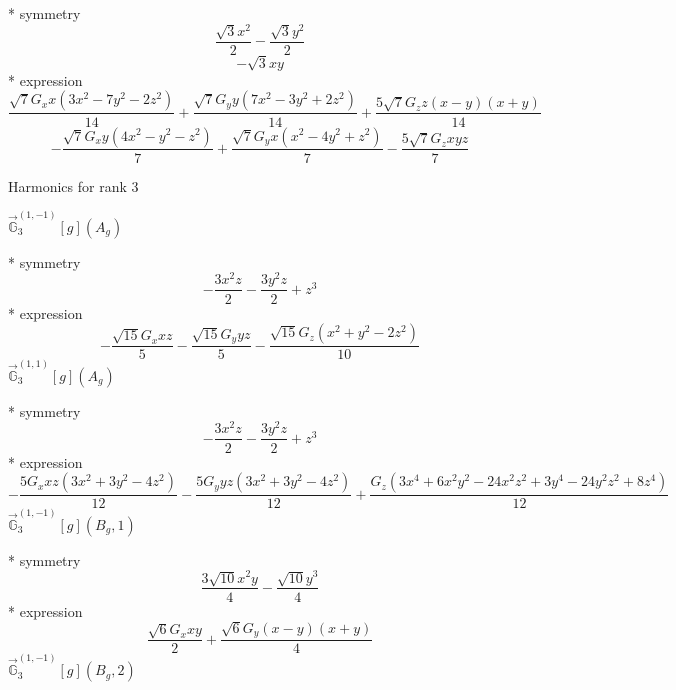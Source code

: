 \documentclass[fleqn,8pt]{jsarticle}
\begin{document}
\noindent\quad ** symmetry
\begin{dmath*}
\frac{\sqrt{3} x^{2}}{2} - \frac{\sqrt{3} y^{2}}{2}
\end{dmath*}
\begin{dmath*}
- \sqrt{3} x y
\end{dmath*}
\noindent\quad ** expression
\begin{dmath*}
\frac{\sqrt{7} G_{x} x \left(3 x^{2} - 7 y^{2} - 2 z^{2}\right)}{14} + \frac{\sqrt{7} G_{y} y \left(7 x^{2} - 3 y^{2} + 2 z^{2}\right)}{14} + \frac{5 \sqrt{7} G_{z} z \left(x - y\right) \left(x + y\right)}{14}
\end{dmath*}
\begin{dmath*}
- \frac{\sqrt{7} G_{x} y \left(4 x^{2} - y^{2} - z^{2}\right)}{7} + \frac{\sqrt{7} G_{y} x \left(x^{2} - 4 y^{2} + z^{2}\right)}{7} - \frac{5 \sqrt{7} G_{z} x y z}{7}
\end{dmath*}

\noindent * Harmonics for rank 3

\noindent\quad $\vec{\mathbb{G}}_{3}^{(1,-1)}[g](A_{g})$

\noindent\quad ** symmetry
\begin{dmath*}
- \frac{3 x^{2} z}{2} - \frac{3 y^{2} z}{2} + z^{3}
\end{dmath*}
\noindent\quad ** expression
\begin{dmath*}
- \frac{\sqrt{15} G_{x} x z}{5} - \frac{\sqrt{15} G_{y} y z}{5} - \frac{\sqrt{15} G_{z} \left(x^{2} + y^{2} - 2 z^{2}\right)}{10}
\end{dmath*}
\noindent\quad $\vec{\mathbb{G}}_{3}^{(1,1)}[g](A_{g})$

\noindent\quad ** symmetry
\begin{dmath*}
- \frac{3 x^{2} z}{2} - \frac{3 y^{2} z}{2} + z^{3}
\end{dmath*}
\noindent\quad ** expression
\begin{dmath*}
- \frac{5 G_{x} x z \left(3 x^{2} + 3 y^{2} - 4 z^{2}\right)}{12} - \frac{5 G_{y} y z \left(3 x^{2} + 3 y^{2} - 4 z^{2}\right)}{12} + \frac{G_{z} \left(3 x^{4} + 6 x^{2} y^{2} - 24 x^{2} z^{2} + 3 y^{4} - 24 y^{2} z^{2} + 8 z^{4}\right)}{12}
\end{dmath*}
\noindent\quad $\vec{\mathbb{G}}_{3}^{(1,-1)}[g](B_{g},1)$

\noindent\quad ** symmetry
\begin{dmath*}
\frac{3 \sqrt{10} x^{2} y}{4} - \frac{\sqrt{10} y^{3}}{4}
\end{dmath*}
\noindent\quad ** expression
\begin{dmath*}
\frac{\sqrt{6} G_{x} x y}{2} + \frac{\sqrt{6} G_{y} \left(x - y\right) \left(x + y\right)}{4}
\end{dmath*}
\noindent\quad $\vec{\mathbb{G}}_{3}^{(1,-1)}[g](B_{g},2)$
\end{document}
